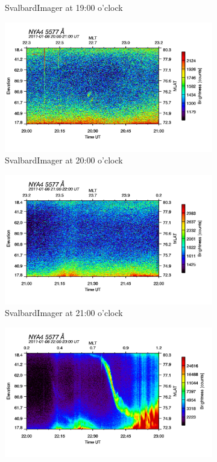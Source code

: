 \documentclass[10pt,a4paper]{article}
\begin{document}
\begin{figure}[h]
\begin{subfigure}{0.3\textwidth}
	\caption{ SvalbardImager at 19:00 o'clock \label{SBI_5_19}}
\end{subfigure}
\begin{subfigure}{0.3\textwidth}
\centering
	\includegraphics[width=\textwidth]{SvalbardImager5577A20.png}
	\caption{ SvalbardImager at 20:00 o'clock \label{SBI_5_20}}
\end{subfigure}
\begin{subfigure}{0.3\textwidth}
\centering
	\includegraphics[width=\textwidth]{SvalbardImager5577A21.png}
	\caption{ SvalbardImager at 21:00 o'clock \label{SBI_5_21}}
\end{subfigure}
\begin{subfigure}{0.3\textwidth}
\centering
	\includegraphics[width=\textwidth]{SvalbardImager5577A22.png}

\end{subfigure}
\end{figure}
\end{document}
